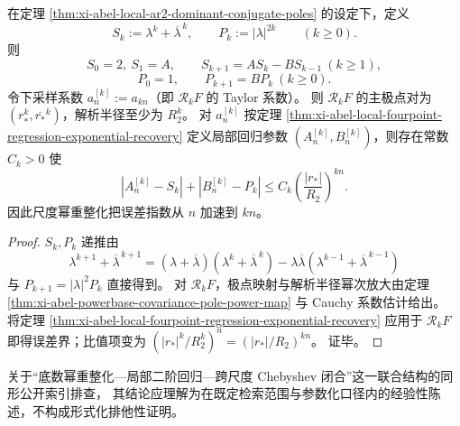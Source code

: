\begin{corollary}[跨尺度闭合递推与误差指数加速]\label{cor:xi-abel-crossscale-chebyshev-closure-acceleration}
在定理 \ref{thm:xi-abel-local-ar2-dominant-conjugate-poles} 的设定下，定义
\[
S_k:=\lambda^k+\overline\lambda^{\,k},\qquad
P_k:=|\lambda|^{2k}\qquad(k\ge 0).
\]
则
\[
S_0=2,\ S_1=A,\qquad S_{k+1}=AS_k-BS_{k-1}\ (k\ge 1),
\]
\[
P_0=1,\qquad P_{k+1}=BP_k\ (k\ge 0).
\]
令下采样系数 \(a_n^{[k]}:=a_{kn}\)（即 \(\mathcal R_kF\) 的 Taylor 系数）。
则 \(\mathcal R_kF\) 的主极点对为 \((r_\ast^k,\overline{r_\ast}^k)\)，解析半径至少为 \(R_2^k\)。
对 \(a_n^{[k]}\) 按定理 \ref{thm:xi-abel-local-fourpoint-regression-exponential-recovery} 定义局部回归参数
\((A_n^{[k]},B_n^{[k]})\)，则存在常数 \(C_k>0\) 使
\[
|A_n^{[k]}-S_k|+|B_n^{[k]}-P_k|
\le
C_k\left(\frac{|r_\ast|}{R_2}\right)^{kn}.
\]
因此尺度幂重整化把误差指数从 \(n\) 加速到 \(kn\)。
\end{corollary}
\begin{proof}
\(S_k,P_k\) 递推由
\[
\lambda^{k+1}+\overline\lambda^{\,k+1}
=(\lambda+\overline\lambda)(\lambda^k+\overline\lambda^{\,k})-\lambda\overline\lambda(\lambda^{k-1}+\overline\lambda^{\,k-1})
\]
与 \(P_{k+1}=|\lambda|^2P_k\) 直接得到。
对 \(\mathcal R_kF\)，极点映射与解析半径幂次放大由定理
\ref{thm:xi-abel-powerbase-covariance-pole-power-map} 与 Cauchy 系数估计给出。
将定理 \ref{thm:xi-abel-local-fourpoint-regression-exponential-recovery} 应用于 \(\mathcal R_kF\) 即得误差界；比值项变为
\(
(|r_\ast|^k/R_2^k)^n=(|r_\ast|/R_2)^{kn}
\)。
证毕。
\end{proof}

\begin{remark}[公开索引排查范围说明]\label{rem:xi-abel-local-recursion-public-index-note}
关于“底数幂重整化—局部二阶回归—跨尺度 Chebyshev 闭合”这一联合结构的同形公开索引排查，
其结论应理解为在既定检索范围与参数化口径内的经验性陈述，不构成形式化排他性证明。
\end{remark}

\endinput


